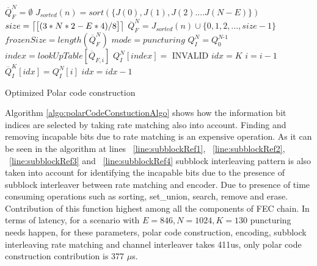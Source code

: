 \IncMargin{1.5em}
\begin{algorithm}[H]
	$\overline{Q}_{\textit{F}}^{\textit{N}} = \emptyset$ \;
	 {
		 {   %
			$J_{sorted}(n) = sort(\{J(0),J(1),J(2)....J(N-E)\})$\;  \label{line:OptisubblockRef1}
			 {
				$size = \ceil*{\big[(3*N*2 - E*4)/8\big]}$\;
			} 
			$\overline{Q}_{F}^{N} = J_{sorted}(n) \cup \{0,1,2, ... ,size-1\}$ \; \label{line:OptisubblockRef2}
			$frozenSize = length(\overline{Q}_{F}^{N})$ \;
			$mode = puncturing$ \;
		} 
	}
	$Q_{\textit{I}}^{\textit{N}} = Q_{\textit{0}}^{\textit{N-1}}$ \;	
	 {
		 {
			$index = lookUpTable[\overline{Q}_{F,i}]$\;
		} 
		$Q_{I}^{N}[index] = $ INVALID \;
	}
	$idx = K$ \;
	 {
		$i = i-1$ \;
		 {
			$\overline{Q}_{\textit{I}}^{\textit{K}}[idx] = Q_{I}^{N}[i]$ \;
			$idx = idx-1$ \;
		}
	}
	\caption{Optimized Polar code construction}
	\label{algo:polarCodeConstuctionAlgoOptimized}
\end{algorithm}
\DecMargin{1.5em}

Algorithm \ref{algo:polarCodeConstuctionAlgo} shows how the information bit indices are selected by taking rate matching also into account. Finding and removing incapable bits due to rate matching is an expensive operation. As it can be seen in the algorithm at lines ~\ref{line:subblockRef1}, ~\ref{line:subblockRef2}, ~\ref{line:subblockRef3} and ~\ref{line:subblockRef4} subblock interleaving pattern is also taken into account for identifying the incapable bits due to the presence of subblock interleaver between rate matching and encoder. Due to presence of time consuming operations such as sorting, set\_union, search, remove and erase. Contribution of this function highest among all the components of FEC chain. In terms of latency, for a scenario with $E = 846, N = 1024, K = 130$ puncturing needs happen, for these parameters, polar code construction, encoding, subblock interleaving rate matching and channel interleaver takes 411us, only polar code construction contribution is 377 $\mu$s. \newline

